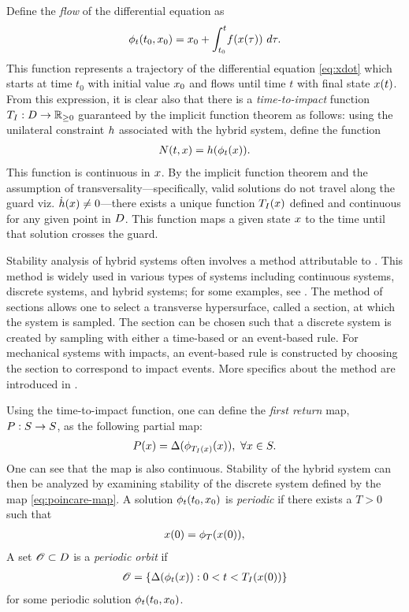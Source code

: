 Define the {\em flow} of the differential equation as
\begin{align*}
  \flowt(t_{0}, \x_{0}) = \x_{0} + \int_{t_{0}}^{t} \! \xf(\x\argtau) \ d\tau.
\end{align*}
%
This function represents a trajectory of the differential equation
\eqref{eq:xdot} which starts at time $t_{0}$ with initial value $x_{0}$ and
flows until time $t$ with final state $x(t)$.
%
From this expression, it is clear also that there is a {\em time-to-impact} function
$T_{I} : D \to \mathbb{R}_{\geq 0}$ guaranteed by the implicit function theorem as follows:
%
using the unilateral constraint $h$ associated with the hybrid system, define
the function
\begin{align*}
  N(t, x) = h(\phi_{t}(x)).
\end{align*}
%
This function is continuous in $x$.
%
By the implicit function theorem and the assumption of
transversality---specifically, valid solutions do not travel along the guard
viz. ${\dot {h}}(x) \ne 0$---there exists a unique function $T_{I}(x)$ defined and
continuous for any given point in $D$.\xspace
%
This function maps a given state $x$ to the time until that solution crosses
the guard.
%

Stability analysis of hybrid systems often involves a method attributable to
\Poincare{}.
%
This method is widely used in various types of systems including continuous
systems, discrete systems, and hybrid systems; for some examples, see
\cite{Grizzle2014, Guckenheimer1983, Parker1989, Perko2001}.
%
The method of \Poincare{} sections allows one to select a transverse hypersurface,
called a \Poincare{} section, at which the system is sampled.
%
The \Poincare{} section can be chosen such that a discrete system is created by
sampling with either a time-based or an event-based rule.
%
For mechanical systems with impacts, an event-based rule is constructed by
choosing the \Poincare{} section to correspond to impact events.\xspace
%
More specifics about the \Poincare{} method are introduced in
.

Using the time-to-impact function, one can define the {\em \Poincare{} first
  return} map, $P : S \to S$, as the following partial map:
%
\begin{align}
  \label{eq:poincare-map}
  P(x)  = \Delta(\phi_{T_{I}(x)}(x)), \ \forall x \in S.
\end{align}
%
One can see that the \Poincare{} map is also continuous.
%
Stability of the hybrid system can then be analyzed by examining stability of
the discrete system \cite{Morris2009} defined by the \Poincare{} map
\eqref{eq:poincare-map}.
%
A solution $\phi_{t}(t_{0}, x_{0})$ is {\em periodic} if there exists a $T > 0$
such that
\begin{align*}
  x(0) = \phi_{T}(x(0)),
\end{align*}
%
A set ${\mathscr O} \subset D$ is a {\em periodic orbit} if
\begin{align*}
  {\mathscr O} = \{ \Delta(\phi_{t}(x)) : 0 < t < T_{I}(x(0)) \}
\end{align*}
for some periodic solution $\phi_{t}(t_{0}, x_{0})$.

